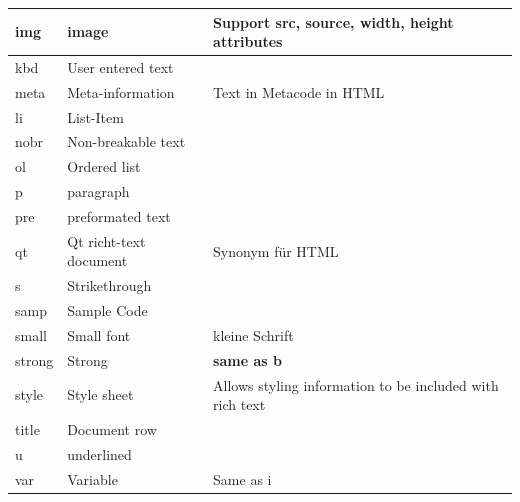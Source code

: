 \begin{longtable}{| p{} | p{} | p{}|}
	\hline img&image& Support src, source, width, height attributes\\
	\hline kbd& User entered text&\\
	\hline meta & Meta-information& Text in Metacode in HTML\\
	\hline li & List-Item&\\
	\hline nobr & Non-breakable text&\\
	\hline ol & Ordered list& \\
	\hline p & paragraph&\\
	\hline pre & preformated text& \\
	\hline qt & Qt richt-text document& Synonym für HTML\\
	\hline s& Strikethrough&\\
	\hline samp & Sample Code&\\
	\hline small & Small font & kleine Schrift\\
	\hline strong & Strong & \textbf{same as b}\\
	\hline style & Style sheet & Allows styling information to be included with rich text\\
	\hline title & Document row & \\
	\hline u & underlined & \\
	\hline var & Variable & Same as i\\
	\hline
\end{longtable}
\clearpage
\newpage

